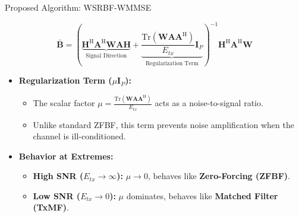 \documentclass[aspectratio=169, 10pt]{beamer}
\begin{document}
\begin{frame}{Proposed Algorithm: WSRBF-WMMSE}


    \begin{equation*}
        \bar{\mathbf{B}} = \left( \underbrace{\mathbf{H}^\mathrm{H} \mathbf{A}^\mathrm{H} \mathbf{W} \mathbf{A} \mathbf{H}}_{\text{Signal Direction}} + \underbrace{\frac{\mathrm{Tr}(\mathbf{W} \mathbf{A} \mathbf{A}^\mathrm{H})}{E_{tx}} \mathbf{I}_P}_{\text{Regularization Term}} \right)^{-1} \mathbf{H}^\mathrm{H} \mathbf{A}^\mathrm{H} \mathbf{W}
    \end{equation*}


    \begin{itemize}
        \item \textbf{Regularization Term ($\mu \mathbf{I}_P$):}
              \begin{itemize}
                  \item The scalar factor $\mu = \frac{\mathrm{Tr}(\mathbf{W} \mathbf{A} \mathbf{A}^\mathrm{H})}{E_{tx}}$ acts as a noise-to-signal ratio.
                  \item Unlike standard ZFBF, this term prevents noise amplification when the channel is ill-conditioned.
              \end{itemize}
              \vspace{1ex}
        \item \textbf{Behavior at Extremes:}
              \begin{itemize}
                  \item \textbf{High SNR ($E_{tx} \to \infty$):} $\mu \to 0$, behaves like \textbf{Zero-Forcing (ZFBF)}.
                  \item \textbf{Low SNR ($E_{tx} \to 0$):} $\mu$ dominates, behaves like \textbf{Matched Filter (TxMF)}.
              \end{itemize}
    \end{itemize}
\end{frame}

\end{document}
